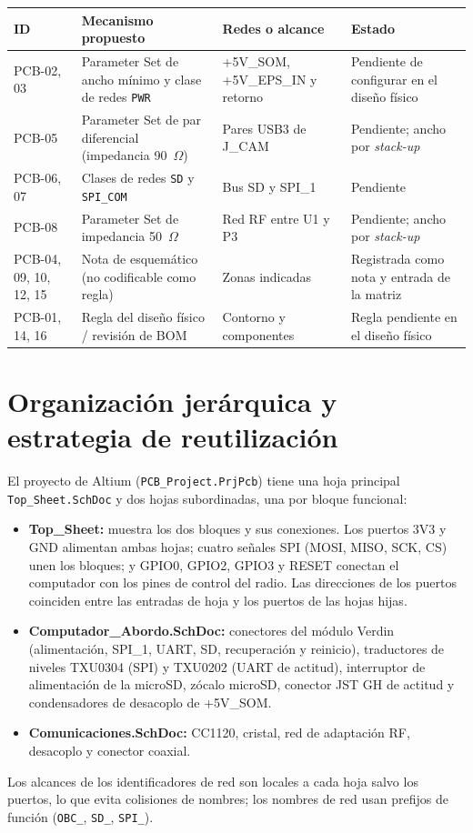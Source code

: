 \documentclass[11pt,letterpaper]{article}
\begin{document}
\begin{longtable}{L{2.2cm}L{4.5cm}L{4.5cm}L{3.6cm}}
\toprule ID & Mecanismo propuesto & Redes o alcance & Estado \\
\midrule\endhead
PCB-02, 03 & Parameter Set de ancho mínimo y clase de redes \texttt{PWR} & +5V\_SOM, +5V\_EPS\_IN y retorno & Pendiente de configurar en el diseño físico \\
PCB-05 & Parameter Set de par diferencial (impedancia 90~$\Omega$) & Pares USB3 de J\_CAM & Pendiente; ancho por \emph{stack-up} \\
PCB-06, 07 & Clases de redes \texttt{SD} y \texttt{SPI\_COM} & Bus SD y SPI\_1 & Pendiente \\
PCB-08 & Parameter Set de impedancia 50~$\Omega$ & Red RF entre U1 y P3 & Pendiente; ancho por \emph{stack-up} \\
PCB-04, 09, 10, 12, 15 & Nota de esquemático (no codificable como regla) & Zonas indicadas & Registrada como nota y entrada de la matriz \\
PCB-01, 14, 16 & Regla del diseño físico / revisión de BOM & Contorno y componentes & Regla pendiente en el diseño físico \\
\bottomrule
\end{longtable}

\section{Organización jerárquica y estrategia de reutilización}
\label{sec:jer}
El proyecto de Altium (\texttt{PCB\_Project.PrjPcb}) tiene una hoja principal \texttt{Top\_Sheet.SchDoc} y dos hojas subordinadas, una por bloque funcional:
\begin{itemize}
\item \textbf{Top\_Sheet:} muestra los dos bloques y sus conexiones. Los puertos 3V3 y GND alimentan ambas hojas; cuatro señales SPI (MOSI, MISO, SCK, CS) unen los bloques; y GPIO0, GPIO2, GPIO3 y RESET conectan el computador con los pines de control del radio. Las direcciones de los puertos coinciden entre las entradas de hoja y los puertos de las hojas hijas.
\item \textbf{Computador\_Abordo.SchDoc:} conectores del módulo Verdin (alimentación, SPI\_1, UART, SD, recuperación y reinicio), traductores de niveles TXU0304 (SPI) y TXU0202 (UART de actitud), interruptor de alimentación de la microSD, zócalo microSD, conector JST GH de actitud y condensadores de desacoplo de +5V\_SOM.
\item \textbf{Comunicaciones.SchDoc:} CC1120, cristal, red de adaptación RF, desacoplo y conector coaxial.
\end{itemize}
Los alcances de los identificadores de red son locales a cada hoja salvo los puertos, lo que evita colisiones de nombres; los nombres de red usan prefijos de función (\texttt{OBC\_}, \texttt{SD\_}, \texttt{SPI\_}).
\end{document}
